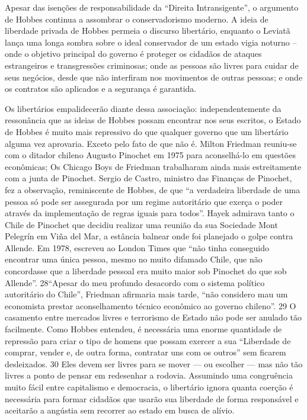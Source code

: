 \par
 
Apesar das isenções de responsabilidade da “Direita Intransigente”, o argumento de Hobbes continua a assombrar o conservadorismo moderno. A ideia de liberdade privada de Hobbes permeia o discurso libertário, enquanto o Leviatã lança uma longa sombra sobre o ideal conservador de um estado vigia noturno – onde o objetivo principal do governo é proteger os cidadãos de ataques estrangeiros e transgressões criminosas; onde as pessoas são livres para cuidar de seus negócios, desde que não interfiram nos movimentos de outras pessoas; e onde os contratos são aplicados e a segurança é garantida.
 
\par
 
Os libertários empalidecerão diante dessa associação: independentemente da ressonância que as ideias de Hobbes possam encontrar nos seus escritos, o Estado de Hobbes é muito mais repressivo do que qualquer governo que um libertário alguma vez aprovaria. Exceto pelo fato de que não é. Milton Friedman reuniu-se com o ditador chileno Augusto Pinochet em 1975 para aconselhá-lo em questões econômicas; Os Chicago Boys de Friedman trabalharam ainda mais estreitamente com a junta de Pinochet. Sergio de Castro, ministro das Finanças de Pinochet, fez a observação, reminiscente de Hobbes, de que “a verdadeira liberdade de uma pessoa só pode ser assegurada por um regime autoritário que exerça o poder através da implementação de regras iguais para todos”. Hayek admirava tanto o Chile de Pinochet que decidiu realizar uma reunião da sua Sociedade Mont Pelegrín em Viña del Mar, a estância balnear onde foi planejado o golpe contra Allende. Em 1978, escreveu ao London Times que “não tinha conseguido encontrar uma única pessoa, mesmo no muito difamado Chile, que não concordasse que a liberdade pessoal era muito maior sob Pinochet do que sob Allende”. 28“Apesar do meu profundo desacordo com o sistema político autoritário do Chile”, Friedman afirmaria mais tarde, “não considero mau um economista prestar aconselhamento técnico econômico ao governo chileno”.
 {\color{blue} 29}  
O casamento entre mercados livres e terrorismo de Estado não pode ser anulado tão facilmente. Como Hobbes entendeu, é necessária uma enorme quantidade de repressão para criar o tipo de homens que possam exercer a sua “Liberdade de comprar, vender e, de outra forma, contratar uns com os outros” sem ficarem desleixados.
 {\color{blue} 30}  
Eles devem ser livres para se mover — ou escolher — mas não tão livres a ponto de pensar em redesenhar a rodovia. Assumindo uma congruência muito fácil entre capitalismo e democracia, o libertário ignora quanta coerção é necessária para formar cidadãos que usarão sua liberdade de forma responsável e aceitarão a angústia sem recorrer ao estado em busca de alívio.
 
